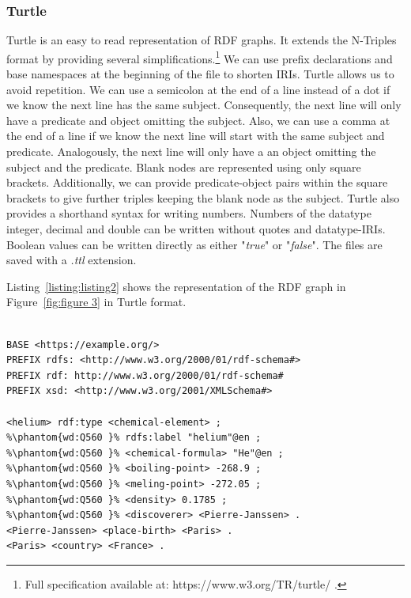 \subsubsection{Turtle}
Turtle is an easy to read representation of RDF graphs. It extends the N-Triples format by providing several simplifications.\footnote{Full specification available at: https://www.w3.org/TR/turtle/ .} We can use prefix declarations and base namespaces at the beginning of the file to shorten IRIs. Turtle allows us to avoid repetition. We can use a semicolon at the end of a line instead of a dot if we know the next line has the same subject. Consequently, the next line will only have a predicate and object omitting the subject. Also, we can use a comma at the end of a line if we know the next line will start with the same subject and predicate. Analogously, the next line will only have a an object omitting the subject and the predicate. Blank nodes are represented using only square brackets. Additionally, we can provide predicate-object pairs within the square brackets to give further triples keeping the blank node as the subject. Turtle also provides a shorthand syntax for writing numbers. Numbers of the datatype integer, decimal and double can be written without quotes and datatype-IRIs. Boolean values can be written directly as either "\textit{true}" or "\textit{false}". The files are saved with a \textit{.ttl} extension.

Listing~\ref{listing:listing2} shows the representation of the RDF graph in Figure~\ref{fig:figure 3} in Turtle format. 

\begin{minipage}{\linewidth}
\begin{lstlisting}[label=listing:listing2, caption={RDF graph represented in Turtle syntax}, language=SPARQL]

BASE <https://example.org/>
PREFIX rdfs: <http://www.w3.org/2000/01/rdf-schema#>
PREFIX rdf: http://www.w3.org/2000/01/rdf-schema#
PREFIX xsd: <http://www.w3.org/2001/XMLSchema#>

<helium> rdf:type <chemical-element> ;
%\phantom{wd:Q560 }% rdfs:label "helium"@en ;
%\phantom{wd:Q560 }% <chemical-formula> "He"@en ;
%\phantom{wd:Q560 }% <boiling-point> -268.9 ;
%\phantom{wd:Q560 }% <meling-point> -272.05 ;
%\phantom{wd:Q560 }% <density> 0.1785 ;
%\phantom{wd:Q560 }% <discoverer> <Pierre-Janssen> .
<Pierre-Janssen> <place-birth> <Paris> .
<Paris> <country> <France> .
\end{lstlisting}
\end{minipage}



